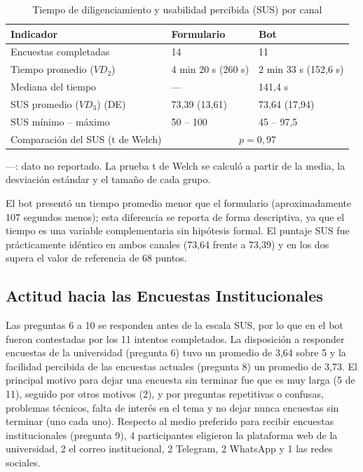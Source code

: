 \documentclass[12pt,letterpaper]{article}
\begin{document}
\begin{table}[htbp]
\centering
\caption{Tiempo de diligenciamiento y usabilidad percibida (SUS) por canal}
\label{tab:tiempo-sus}
\small
\begin{tabular}{|p{5cm}|p{4.2cm}|p{4.2cm}|}
\hline
\textbf{Indicador} & \textbf{Formulario} & \textbf{Bot} \\ \hline
Encuestas completadas & 14 & 11 \\ \hline
Tiempo promedio ($VD_2$) & 4 min 20 s (260 s) & 2 min 33 s (152,6 s) \\ \hline
Mediana del tiempo & --- & 141,4 s \\ \hline
SUS promedio ($VD_3$) (DE) & 73,39 (13,61) & 73,64 (17,94) \\ \hline
SUS mínimo -- máximo & 50 -- 100 & 45 -- 97,5 \\ \hline
Comparación del SUS (t de Welch) & \multicolumn{2}{c|}{$p=0{,}97$} \\ \hline
\end{tabular}

\vspace{0.2cm}
{\footnotesize ---: dato no reportado. La prueba t de Welch se calculó a partir de la media, la desviación estándar y el tamaño de cada grupo.}
\end{table}

El bot presentó un tiempo promedio menor que el formulario (aproximadamente 107 segundos menos); esta diferencia se reporta de forma descriptiva, ya que el tiempo es una variable complementaria sin hipótesis formal. El puntaje SUS fue prácticamente idéntico en ambos canales (73,64 frente a 73,39) y en los dos supera el valor de referencia de 68 puntos.

\subsection{Actitud hacia las Encuestas Institucionales}

Las preguntas 6 a 10 se responden antes de la escala SUS, por lo que en el bot fueron contestadas por los 11 intentos completados. La disposición a responder encuestas de la universidad (pregunta 6) tuvo un promedio de 3,64 sobre 5 y la facilidad percibida de las encuestas actuales (pregunta 8) un promedio de 3,73. El principal motivo para dejar una encuesta sin terminar fue que es muy larga (5 de 11), seguido por otros motivos (2), y por preguntas repetitivas o confusas, problemas técnicos, falta de interés en el tema y no dejar nunca encuestas sin terminar (uno cada uno). Respecto al medio preferido para recibir encuestas institucionales (pregunta 9), 4 participantes eligieron la plataforma web de la universidad, 2 el correo institucional, 2 Telegram, 2 WhatsApp y 1 las redes sociales.
\end{document}

